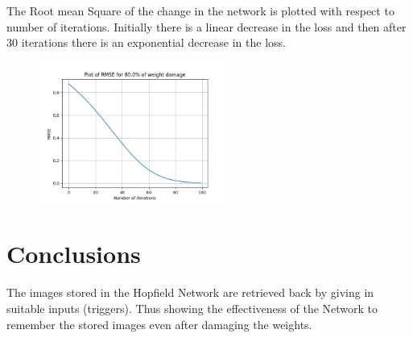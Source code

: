 \documentclass{article}
\begin{document}
\begin{figure}[H]
\hspace{0.001\textwidth}
\end{figure}


The Root mean Square of the change in the network is plotted with respect to number of iterations. Initially there is a linear decrease in the loss and then after 30 iterations there is an exponential decrease in the loss.
\begin{figure}[H]
\includegraphics[width=0.55\textwidth]{cat_42.png}
\centering
\end{figure}

\section{Conclusions}
The images stored in the Hopfield Network are retrieved back by giving in suitable inputs (triggers). Thus showing the effectiveness of the Network to remember the stored images even after damaging the weights.
\end{document}
